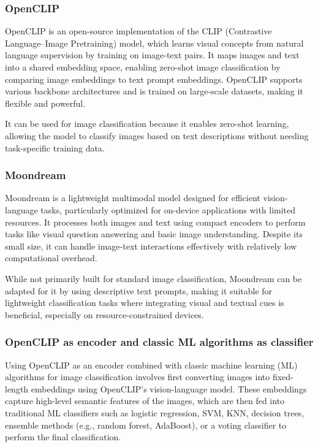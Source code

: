 \documentclass[11pt,a4paper,onecolumn]{article}
\begin{document}
\subsubsection{OpenCLIP}
OpenCLIP is an open-source implementation of the CLIP (Contrastive Language–Image Pretraining) model, which learns
visual concepts from natural language supervision by training on image-text pairs. It maps images and text into a
shared embedding space, enabling zero-shot image classification by comparing image embeddings to text prompt
embeddings. OpenCLIP supports various backbone architectures and is trained on large-scale datasets, making it
flexible and powerful.

It can be used for image classification because it enables zero-shot learning, allowing the model to classify images
based on text descriptions without needing task-specific training data.

\subsubsection{Moondream}
Moondream is a lightweight multimodal model designed for efficient vision-language tasks, particularly optimized for
on-device applications with limited resources. It processes both images and text using compact encoders to perform
tasks like visual question answering and basic image understanding. Despite its small size, it can handle image-text
interactions effectively with relatively low computational overhead.

While not primarily built for standard image classification, Moondream can be adapted for it by using descriptive
text prompts, making it suitable for lightweight classification tasks where integrating visual and textual cues is
beneficial, especially on resource-constrained devices.

\subsubsection{OpenCLIP as encoder and classic ML algorithms as classifier}
Using OpenCLIP as an encoder combined with classic machine learning (ML) algorithms for image classification
involves first converting images into fixed-length embeddings using OpenCLIP's vision-language model. These
embeddings capture high-level semantic features of the images, which are then fed into traditional ML classifiers
such as logistic regression, SVM, KNN, decision trees, ensemble methods (e.g., random forest, AdaBoost), or a voting
classifier to perform the final classification.
\end{document}
